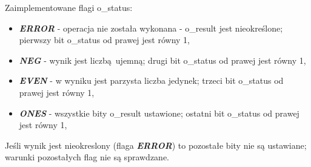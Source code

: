 Zaimplementowane flagi o\_status:

\begin{itemize}
	\item \emph{\textbf{ERROR}} - operacja nie została wykonana - o\_result jest nieokreślone; pierwszy bit o\_status od prawej jest równy 1,
	\item \emph{\textbf{NEG}} - wynik jest liczbą ujemną; drugi bit o\_status od prawej jest równy 1,
	\item \emph{\textbf{EVEN}} - w wyniku jest parzysta liczba jedynek; trzeci bit o\_status od prawej jest równy 1,
	\item \emph{\textbf{ONES}} - wszystkie bity o\_result ustawione; ostatni bit o\_status od prawej jest równy 1,
\end{itemize}

\noindent
Jeśli wynik jest nieokreslony (flaga \emph{\textbf{ERROR}}) to pozostałe bity nie są ustawiane; warunki pozostałych flag nie są sprawdzane.